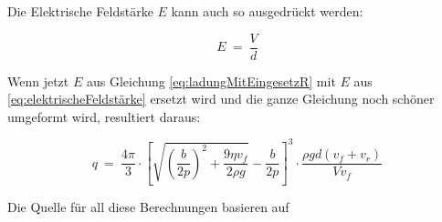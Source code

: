 \noindent Die Elektrische Feldstärke $E$ kann auch so ausgedrückt werden:

\begin{equation}\label{eq:elektrischeFeldstärke}
	E \ = \ \frac{V}{d}
\end{equation}

\noindent Wenn jetzt $E$ aus Gleichung \ref{eq:ladungMitEingesetzR} mit $E$ aus \autoref{eq:elektrischeFeldstärke} ersetzt wird und die ganze Gleichung noch schöner umgeformt wird, resultiert daraus:

\begin{equation}\label{eq:letzteFormel}
	q \ = \ \frac{4\pi}{3} \cdot \left[ \sqrt{\left( \frac{b}{2p}\right)^2 + \frac{9\eta v_f}{2\rho g}} - \frac{b}{2p} \right]^3 \cdot \frac{\rho gd(v_f + v_r)}{Vv_f}
\end{equation}

\noindent Die Quelle für all diese Berechnungen basieren auf \parencite[1/2/9]{instructionManual}




	


